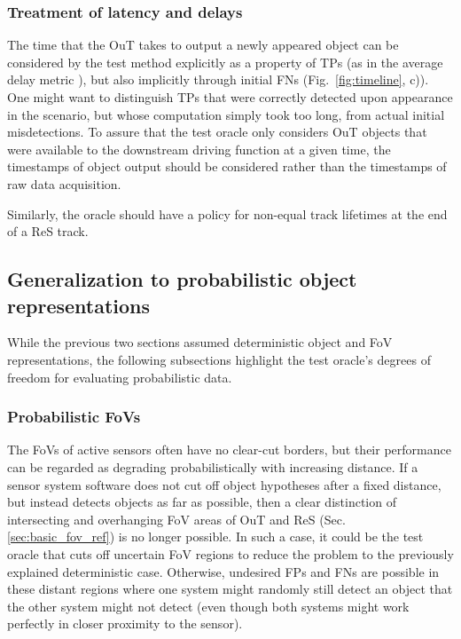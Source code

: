 \documentclass[conference]{IEEEtran}
\begin{document}


\subsubsection{Treatment of latency and delays}
\label{sec:temp_latency}

The time that the OuT takes to output a newly appeared object can be considered by the test method explicitly as a property of TPs (as in the average delay metric \cite{Mao2019delay}), but also implicitly through initial FNs (Fig.~\ref{fig:timeline}, c)).
One might want to distinguish TPs that were correctly detected upon appearance in the scenario, but whose computation simply took too long, from actual initial misdetections.
To assure that the test oracle only considers OuT objects that were available to the downstream driving function at a given time, the timestamps of object output should be considered rather than the timestamps of raw data acquisition.


Similarly, the oracle should have a policy for non-equal track lifetimes at the end of a ReS track. 



\subsection{Generalization to probabilistic object representations}
\label{sec:oracle_probabilistic}

While the previous two sections assumed deterministic object and FoV representations, the following subsections highlight the test oracle's degrees of freedom for evaluating probabilistic data.

\subsubsection{Probabilistic FoVs}
\label{sec:prob_fov}

The FoVs of active sensors often have no clear-cut borders, but their performance can be regarded as degrading probabilistically with increasing distance. 
If a sensor system software does not cut off object hypotheses after a fixed distance, but instead detects objects as far as possible, then a clear distinction of intersecting and overhanging FoV areas of OuT and ReS (Sec. \ref{sec:basic_fov_ref}) is no longer possible.
In such a case, it could be the test oracle that cuts off uncertain FoV regions to reduce the problem to the previously explained deterministic case.
Otherwise, undesired FPs and FNs are possible in these distant regions where one system might randomly still detect an object that the other system might not detect (even though both systems might work perfectly in closer proximity to the sensor).
\end{document}
